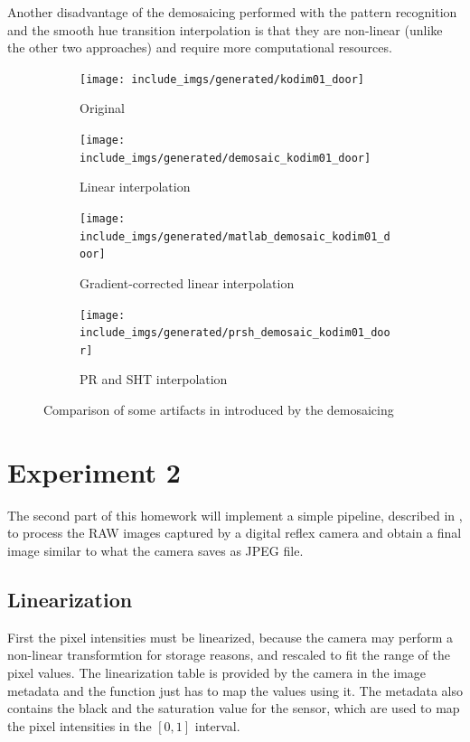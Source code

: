 \documentclass[a4paper,oneside]{article}
\begin{document}
Another disadvantage of the demosaicing performed with the pattern
recognition and the smooth hue transition interpolation is that they
are non-linear (unlike the other two approaches) and require more
computational resources.
\begin{figure}[htbp]
  \centering
  \begin{subfigure}{0.4\textwidth}
    \centering
    \texttt{[image: include\_imgs/generated/kodim01\_door]}
    \caption{Original}
  \end{subfigure}%
  \begin{subfigure}{0.4\textwidth}
    \centering
    \texttt{[image: include\_imgs/generated/demosaic\_kodim01\_door]}
    \caption{Linear interpolation}
  \end{subfigure}
  \begin{subfigure}{0.4\textwidth}
    \centering
    \texttt{[image: include\_imgs/generated/matlab\_demosaic\_kodim01\_door]}
    \caption{Gradient-corrected linear interpolation}
  \end{subfigure}%
  \begin{subfigure}{0.4\textwidth}
    \centering
    \texttt{[image: include\_imgs/generated/prsh\_demosaic\_kodim01\_door]}
    \caption{PR and SHT interpolation}
  \end{subfigure}
  \caption{Comparison of some artifacts in 
    introduced by the demosaicing}
  \label{fig:door}
\end{figure}

\section*{Experiment 2} 
The second part of this homework will implement a simple pipeline,
described in \cite{rawguide}, to process the RAW images captured by a
digital reflex camera and obtain a final image similar to what the
camera saves as JPEG file.

\subsection{Linearization}
First the pixel intensities must be linearized, because the camera may
perform a non-linear transformtion for storage reasons, and rescaled
to fit the range of the pixel values. The linearization table is
provided by the camera in the image metadata and the
 function just has to map the values using
it. The metadata also contains the black and the saturation value for
the sensor, which are used to map the pixel intensities in the $[0,1]$
interval.
\end{document}
